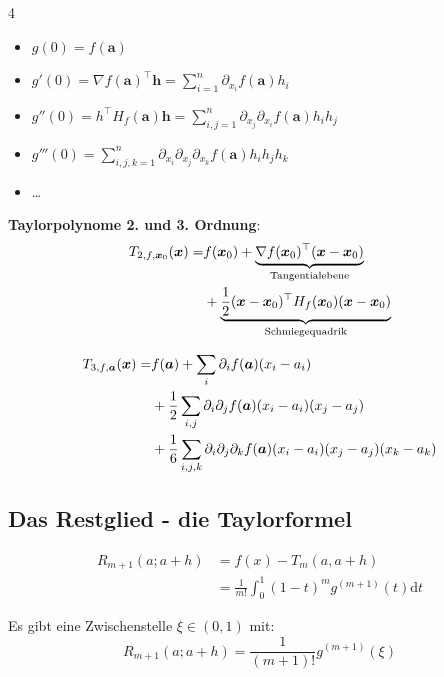 \documentclass[6pt,a4paper]{scrartcl}
\renewcommand{\vec}[1]{\ensuremath{\boldsymbol {#1}}}                                           %
\begin{document}
\begin{multicols*}{4}
    \begin{itemize}
        \item $g(0) = f(\vec a)$
        \item $g'(0) = \nabla f(\vec a)^\top \vec h = \sum_{i=1}^{n}\partial _{x_i} f(\vec a)h_i$
        \item $g''(0) = h^\top H_f(\vec a) \vec h = \sum_{i,j=1}^{n} \partial_{x_j}\partial_{x_i}f(\vec a)h_i h_j$
        \item $g'''(0) = \sum_{i,j,k=1}^{n} \partial_{x_i}\partial_{x_j}\partial_{x_k}f(\vec a)h_i h_j h_k$
        \item \dots
    \end{itemize}
    \textbf{Taylorpolynome 2. und 3. Ordnung}:
    \begin{align*}
T_{2,f,\vec x_0}(\vec x)
= & f(\vec x_0)
+ \underbrace{\nabla f(\vec x_0)^\top (\vec x - \vec x_0)}_{\text{Tangentialebene}} \notag \\
& + \underbrace{\frac{1}{2}(\vec x - \vec x_0)^\top H_f(\vec x_0)(\vec x - \vec x_0)}_{\text{Schmiegequadrik}}
\end{align*}

\begin{align*}
T_{3,f,\vec a}(\vec x)
= & f(\vec a)
+ \sum_i \partial_i f(\vec a)(x_i - a_i) \notag \\
& + \frac{1}{2} \sum_{i,j} \partial_i \partial_j f(\vec a)
(x_i - a_i)(x_j - a_j) \notag \\
& + \frac{1}{6} \sum_{i,j,k} \partial_i \partial_j \partial_k f(\vec a)
(x_i - a_i)(x_j - a_j)(x_k - a_k)
\end{align*}

    \subsection{Das Restglied - die Taylorformel}
    \begin{equation*}
        \begin{split}
            R_{m+1}(a; a+h) &= f(x)- T_m(a,a+h) \\
            &= \frac{1}{m!} \int_{0}^{1}(1-t)^m g^{(m+1)}(t)\mathrm dt
        \end{split}
    \end{equation*}

    Es gibt eine Zwischenstelle $\xi \in (0,1)$ mit: \\
    \begin{equation*}
        R_{m+1}(a; a+h) = \frac{1}{(m+1)!} g^{(m+1)}(\xi)
    \end{equation*}




\end{multicols*}
\end{document}
